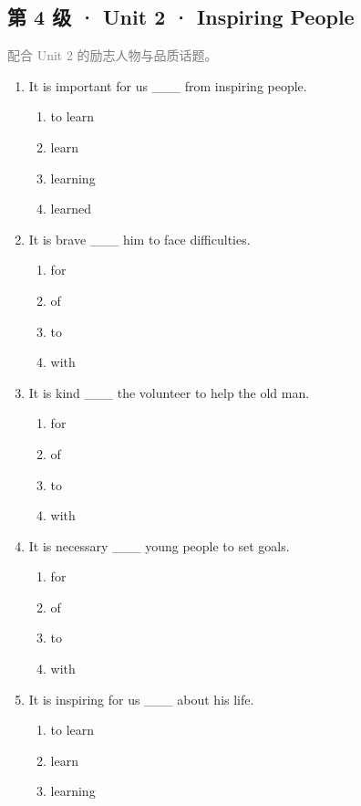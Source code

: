 \documentclass[11pt,a4paper]{ctexart}
\begin{document}
\subsection*{第 4 级 · Unit 2 · Inspiring People}
\noindent\textcolor{gray}{配合 Unit 2 的励志人物与品质话题。}\par\smallskip
\begin{enumerate}[leftmargin=*,itemsep=4pt]
\item It is important for us \_\_\_ from inspiring people.
\begin{enumerate}[label=\Alph*.,leftmargin=2em,itemsep=1pt,topsep=2pt]
\item to learn
\item learn
\item learning
\item learned
\end{enumerate}
\item It is brave \_\_\_ him to face difficulties.
\begin{enumerate}[label=\Alph*.,leftmargin=2em,itemsep=1pt,topsep=2pt]
\item for
\item of
\item to
\item with
\end{enumerate}
\item It is kind \_\_\_ the volunteer to help the old man.
\begin{enumerate}[label=\Alph*.,leftmargin=2em,itemsep=1pt,topsep=2pt]
\item for
\item of
\item to
\item with
\end{enumerate}
\item It is necessary \_\_\_ young people to set goals.
\begin{enumerate}[label=\Alph*.,leftmargin=2em,itemsep=1pt,topsep=2pt]
\item for
\item of
\item to
\item with
\end{enumerate}
\item It is inspiring for us \_\_\_ about his life.
\begin{enumerate}[label=\Alph*.,leftmargin=2em,itemsep=1pt,topsep=2pt]
\item to learn
\item learn
\item learning

\end{enumerate}
\end{enumerate}
\end{document}
